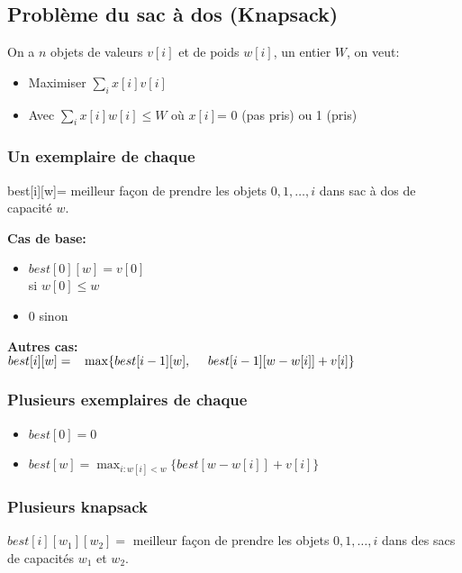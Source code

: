 \subsection{Problème du sac à dos (Knapsack)}
On a $n$ objets de valeurs $v[i]$ et de poids $w[i]$, un entier $W$, on veut:
\begin{itemize}
\item Maximiser  $\sum_i x[i] v[i]$
\item Avec $\sum_i x[i] w[i] \leq W$ \hspace{15pt} où $ x[i] $= 0 (pas pris) ou 1 (pris)
\end{itemize}
\subsubsection{Un exemplaire de chaque}
best[i][w]= meilleur façon de prendre les objets $0, 1, \ldots, i$ dans sac à dos de capacité $w$.

\begin{minipage}{0.25\textwidth}
\textbf{Cas de base:}
\begin{itemize}
\item $best[0][w] = v[0]$ \\si $w[0] \leq w$
\item 0 sinon
\end{itemize}
\end{minipage}
\begin{minipage}{0.25\textwidth}
\textbf{Autres cas:}\\
$best[i][w]   = \\ \text{\ \ }\max \{ best[i-1][w], \\ \text{\ \ \ \ }best[i-1][w-w[i]] + v[i] \}$
\end{minipage}
\subsubsection{Plusieurs exemplaires de chaque}
\begin{itemize}
\item $ best[0] = 0$
\item $best[w] = \max_{i : w[i] < w} \{best[w - w[i]] + v[i]\}$
\end{itemize}

\subsubsection{Plusieurs knapsack}

$best[i][w_1][w_2] =$ meilleur façon de prendre les objets $0, 1, \ldots, i$ dans des sacs de capacités $w_1$ et $w_2$.